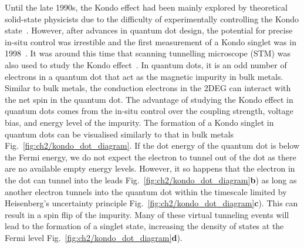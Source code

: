 \begin{figure}[!hbt]
\begin{center}
{      }
  \end{center}
\end{figure}

Until the late 1990s, the Kondo effect had been mainly explored by theoretical solid-state physicists due to the difficulty of experimentally controlling the Kondo state~\cite{kondo_review}. 
However, after advances in quantum dot design, the potential for precise in-situ control was irrestible and the first measurement of a Kondo singlet was in 1998~\cite{goldhaber_first_kondo}. It was around this time that scanning  tunnelling microscope (STM) was also used to study the Kondo effect~\cite{stm_kondo}.
In quantum dots, it is an odd number of electrons in a quantum dot that act as the magnetic impurity in bulk metals. Similar to bulk metals, the conduction electrons in the 2DEG can interact with the net spin in the quantum dot. The advantage of studying the Kondo effect in quantum dots comes from the in-situ control over the coupling strength, voltage bias, and energy level of the impurity.
The formation of a Kondo singlet in quantum dots can be visualised similarly to that in bulk metals Fig.~\ref{fig:ch2/kondo_dot_diagram}. 
If the dot energy of the quantum dot is below the Fermi energy, we do not expect the electron to tunnel out of the dot as there are no available empty energy levels. However, it so happens that the electron in the dot can tunnel into the leads Fig.~\ref{fig:ch2/kondo_dot_diagram}\textbf{b}) as long as another electron tunnels into the quantum dot within the timescale limited by Heisenberg’s uncertainty principle Fig.~\ref{fig:ch2/kondo_dot_diagram}\textbf{c}). This can result in a spin flip of the impurity. Many of these virtual tunneling events will lead to the formation of a singlet state, increasing the density of states at the Fermi level Fig.~\ref{fig:ch2/kondo_dot_diagram}\textbf{d}). 

